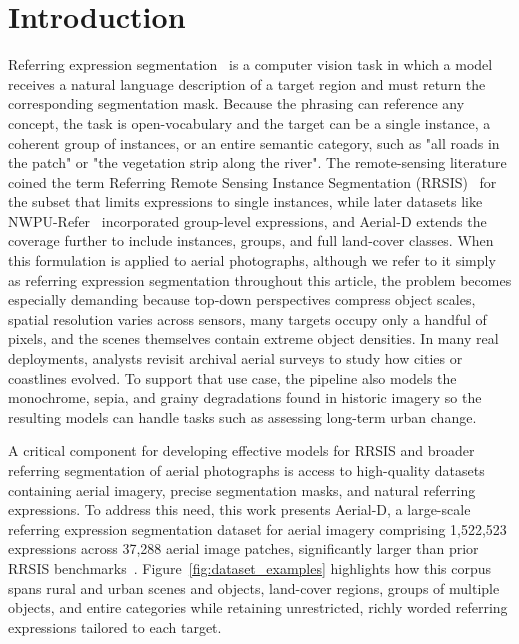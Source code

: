 
\section{Introduction}
\label{sec:intro}

Referring expression segmentation~\cite{kazemzadeh2014referit,hu2016segmentation,yu2016modeling} is a computer vision task in which a model receives a natural language description of a target region and must return the corresponding segmentation mask. Because the phrasing can reference any concept, the task is open-vocabulary and the target can be a single instance, a coherent group of instances, or an entire semantic category, such as "all roads in the patch" or "the vegetation strip along the river". The remote-sensing literature coined the term Referring Remote Sensing Instance Segmentation (RRSIS)~\cite{yuan2023rrsis} for the subset that limits expressions to single instances, while later datasets like NWPU-Refer~\cite{yang2024large} incorporated group-level expressions, and Aerial-D extends the coverage further to include instances, groups, and full land-cover classes. When this formulation is applied to aerial photographs, although we refer to it simply as referring expression segmentation throughout this article, the problem becomes especially demanding because top-down perspectives compress object scales, spatial resolution varies across sensors, many targets occupy only a handful of pixels, and the scenes themselves contain extreme object densities. In many real deployments, analysts revisit archival aerial surveys to study how cities or coastlines evolved. To support that use case, the pipeline also models the monochrome, sepia, and grainy degradations found in historic imagery so the resulting models can handle tasks such as assessing long-term urban change.

A critical component for developing effective models for RRSIS and broader referring segmentation of aerial photographs is access to high-quality datasets containing aerial imagery, precise segmentation masks, and natural referring expressions. To address this need, this work presents Aerial-D, a large-scale referring expression segmentation dataset for aerial imagery comprising 1,522,523 expressions across 37,288 aerial image patches, significantly larger than prior RRSIS benchmarks~\cite{yuan2023rrsis,liu2024rotated,yang2024large}. Figure~\ref{fig:dataset_examples} highlights how this corpus spans rural and urban scenes and objects, land-cover regions, groups of multiple objects, and entire categories while retaining unrestricted, richly worded referring expressions tailored to each target.

